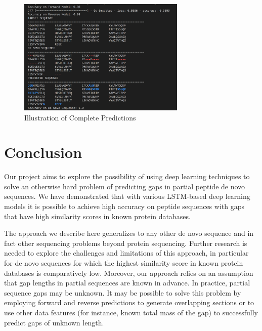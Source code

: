 \documentclass[journal]{IEEEtran}
\begin{document}
    \begin{figure}[h]
      \centering
      \includegraphics[width=8cm]{figures/full_predictions.png}
      \caption{Illustration of Complete Predictions}
      \label{fig:full_predictions}
    \end{figure}

\section{Conclusion}
  Our project aims to explore the possibility of using deep learning techniques to 
  solve an otherwise hard problem of predicting gaps in partial peptide de novo 
  sequences. We have demonstrated that with various LSTM-based deep learning models
  it is possible to achieve high accuracy on peptide sequences with gaps that have high 
  similarity scores in known protein databases.

  The approach we describe here generalizes to any other de novo sequence and in fact
  other sequencing problems beyond protein sequencing. Further research is needed to 
  explore the challenges and limitations of this approach, in particular for
  de novo sequences for which the highest similarity score in known protein databases 
  is comparatively low. Moreover, our approach relies on an assumption that gap 
  lengths in partial sequences are known in advance. In practice, partial sequence
  gaps may be unknown. It may be possible to solve this problem by employing
  forward and reverse predictions to generate overlapping sections or to use other 
  data features (for instance, known total mass of the gap) to successfully predict
  gaps of unknown length.



\end{document}
